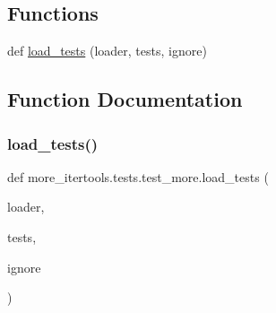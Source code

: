 \subsection*{Functions}
\begin{DoxyCompactItemize}
\item 
def \hyperlink{namespacemore__itertools_1_1tests_1_1test__more_a52469e00b779c1699368c567f036c8ce}{load\+\_\+tests} (loader, tests, ignore)
\end{DoxyCompactItemize}


\subsection{Function Documentation}
\mbox{\label{namespacemore__itertools_1_1tests_1_1test__more_a52469e00b779c1699368c567f036c8ce}} 
\subsubsection{\texorpdfstring{load\+\_\+tests()}{load\_tests()}}
{\footnotesize\ttfamily def more\+\_\+itertools.\+tests.\+test\+\_\+more.\+load\+\_\+tests (\begin{DoxyParamCaption}\item[{}]{loader,  }\item[{}]{tests,  }\item[{}]{ignore }\end{DoxyParamCaption})}

